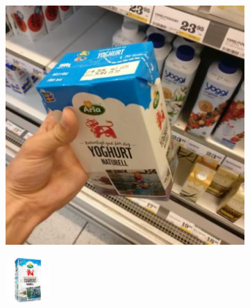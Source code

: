 \begin{figure}[t]
\begin{subfigure}[b]{0.14\textwidth}
		\caption{}
		\label{subfig:onion-decoded}
	\end{subfigure} %
	\begin{subfigure}[b]{0.14\textwidth}
		\centering
		\includegraphics[width=\textwidth]{PaperA/decoded-image-figure/Arla-Natural-Yoghurt_014.jpg}
		\caption{}
		\label{subfig:yogurt-natural}
	\end{subfigure} %
	\begin{subfigure}[b]{0.14\textwidth}
		\centering
		\includegraphics[width=\textwidth]{PaperA/decoded-image-figure/densenet_nov11/Arla-Natural-Yoghurt_decoded.png}

\end{subfigure}
\end{figure}
